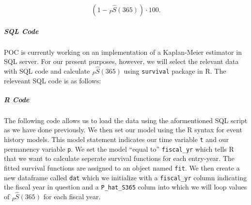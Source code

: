 \documentclass[12pt]{article}\usepackage[]{graphicx}\usepackage[]{color}
\begin{document}
\begin{equation}\label{eq:KM}
(1 - {}_P\hat S(365)) \cdot 100. 
\end{equation}

\subparagraph{SQL Code}

POC is currently working on an implementation of a Kaplan-Meier estimator in SQL server. For our present purposes, however, we will select the relevant data with SQL code and calculate ${}_P\hat S(365)$ using \texttt{survival} package in R. The releveant SQL code is as follows: 



\subparagraph{R Code}

The following code allows us to load the data using the aformentioned SQL script as we have done previously. We then set our model using the R syntax for event history models. This model statement indicates our time variable \texttt{t} and our permanency variable \texttt{p}. We set the model ``equal to'' \texttt{fiscal\_yr} which tells R that we want to calculate seperate survival functions for each entry-year. The fitted survival functions are assigned to an object named \texttt{fit}. We then create a new dataframe called \texttt{dat} which we initialize with a \texttt{fiscal\_yr} column indicating the fiscal year in question and a \texttt{P\_hat\_S365} colum into which we will loop values of ${}_P\hat S(365)$ for each fiscal year. 
\end{document}
